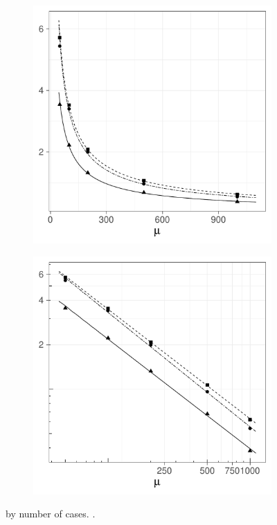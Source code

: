 \begin{figure}[htbp]
    \begin{subfigure}[b]{0.49\textwidth}
        \includegraphics[width=\textwidth]{results/by_num_cases/NMISE-vs-cases}
        \label{fig:ise:unif_NCases_1h:nmise}
    \end{subfigure}
    \begin{subfigure}[b]{0.49\textwidth}
        \includegraphics[width=\textwidth]{results/by_num_cases/NMISE-vs-cases-log-log}
        \label{fig:ise:unif_NCases_1h:nmise_log_log}
    \end{subfigure}
    \caption[ by number of cases]{ by number of cases. \errorplotcaption.}
    \label{fig:ise:unif_NCases_1h}
\end{figure}

